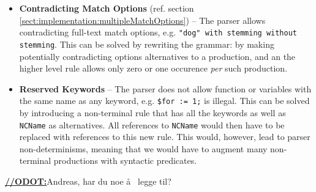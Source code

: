 \begin{itemize}
\item \textbf{Contradicting Match Options} (ref. section \ref{sect:implementation:multipleMatchOptions}) -- The parser allows contradicting full-text match options, e.g. \verb!"dog" with stemming without stemming!. This can be solved by rewriting the grammar: by making potentially contradicting options alternatives to a production, and an the higher level rule allows only zero or one occurence \emph{per} such production.

\item \textbf{Reserved Keywords} -- The parser does not allow function or variables with the same name as any keyword, e.g. \verb!$for := 1;! is illegal. This can be solved by introducing a non-terminal rule that has all the keywords as well as \verb!NCName! as alternatives. All references to \verb!NCName! would then have to be replaced with references to this new rule. This would, however, lead to parser non-determinisms, meaning that we would have to augment many non-terminal productions with syntactic predicates.

\end{itemize}

\underline{\textbf{\LARGE //ODOT:}}Andreas, har du noe \aa~ legge til?
